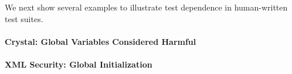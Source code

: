 We next show several examples to illustrate test dependence in human-written
test suites.

\newcommand{\jodatime}{JodaTime\xspace}
%


%


%


\paragraph{Crystal: Global Variables Considered Harmful}


\paragraph{XML Security: Global Initialization}

